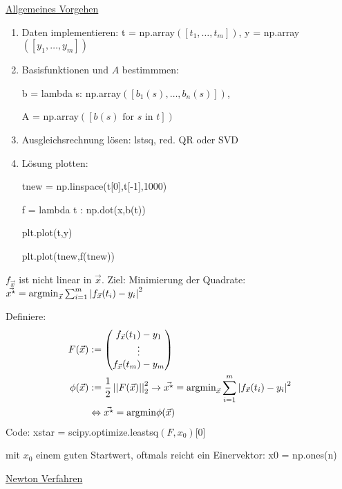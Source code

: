 \underline{Allgemeines Vorgehen}
\begin{enumerate}
    \item Daten implementieren: t = np.array$([t_1,\dots,t_m])$, y = np.array$([y_1,\dots,y_m])$
    \item Basisfunktionen und $A$ bestimmmen:
    
            b = lambda s: np.array$([b_1(s),\dots,b_n(s)])$,
    
            A = np.array$([b(s) \text{ for $s$ in $t$}])$
    \item Ausgleichsrechnung lösen: lstsq, red. QR oder SVD
    \item Lösung plotten:

            tnew = np.linspace(t[0],t[-1],1000)

            f = lambda t : np.dot(x,b(t))

            plt.plot(t,y)

            plt.plot(tnew,f(tnew))
\end{enumerate}

\vspace{1\baselineskip}

\underline{}

$f_{\vec{x}}$ ist nicht linear in $\vec{x}$. Ziel: Minimierung der Quadrate:
$\vec{x^\star} = \text{argmin}_{\vec{x}} \sum_{i=1}^{m} \left\vert f_{\vec{x}}(t_i) - y_i \right\vert^2$

Definiere:
\begin{align*}
    F(\vec{x}) &:= \begin{pmatrix}
        f_{\vec{x}} (t_1) - y_1 \\ \vdots \\ f_{\vec{x}} (t_m) - y_m
    \end{pmatrix}
    \\
    \phi(\vec{x}) &:= \frac{1}{2} \left\vert\left\vert F(\vec{x}) \right\vert\right\vert_2^2 \rightarrow
    \vec{x^\star} = \text{argmin}_{\vec{x}} \sum_{i=1}^{m} \left\vert f_{\vec{x}}(t_i) - y_i \right\vert^2
    \\ &\Leftrightarrow \vec{x^\star} = \text{argmin} \phi(\vec{x})
\end{align*}
Code: xstar = scipy.optimize.leastsq$(F,x_0)$[0]

mit $x_0$ einem guten Startwert, oftmals reicht ein Einervektor: x0 = np.ones(n)

\vspace{1\baselineskip}

\underline{Newton Verfahren}

